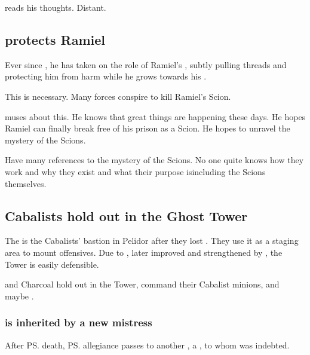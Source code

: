 \Vizsherioch reads his thoughts.
Distant.









\subsection{\Azraid{} protects Ramiel}
Ever since , he has taken on the role of Ramiel's , subtly pulling threads and protecting him from harm while he grows towards his \apotheosis. 

This is necessary. 
Many forces conspire to kill Ramiel's Scion.

\Azraid muses about this. 
He knows that great things are happening these days. 
He hopes Ramiel can finally break free of his prison as a Scion. 
He hopes to unravel the mystery of the Scions. 

Have many references to the mystery of the Scions. 
No one quite knows how they work and why they exist and what their purpose is\dash including the Scions themselves.







\subsection{Cabalists hold out in the Ghost Tower}
The  is the Cabalists' bastion in Pelidor after they lost \Malcur. They use it as a staging area to mount offensives. Due to , later improved and strengthened by \Achsah, the Tower is easily defensible. 

\Achsah{} and Charcoal hold out in the Tower, command their Cabalist minions, and maybe .





\subsubsection{\Achsah{} is inherited by a new mistress}
After \ps{\Teshrial} death, \ps{\Achsah} allegiance passes to another \resvil, a \Mystraacht{}, to whom \Teshrial{} was indebted. 

